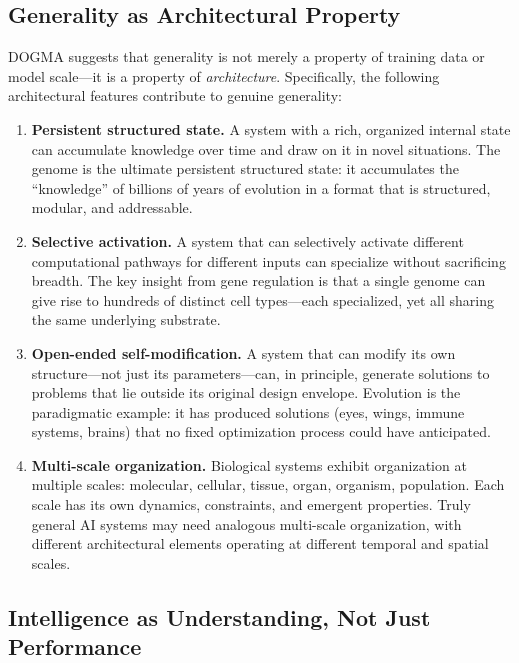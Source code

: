\subsection{Generality as Architectural Property}

DOGMA suggests that generality is not merely a property of training data or model scale---it is a property of \emph{architecture}. Specifically, the following architectural features contribute to genuine generality:

\begin{enumerate}[leftmargin=1.8em]
  \item \textbf{Persistent structured state.} A system with a rich, organized internal state can accumulate knowledge over time and draw on it in novel situations. The genome is the ultimate persistent structured state: it accumulates the ``knowledge'' of billions of years of evolution in a format that is structured, modular, and addressable.

  \item \textbf{Selective activation.} A system that can selectively activate different computational pathways for different inputs can specialize without sacrificing breadth. The key insight from gene regulation is that a single genome can give rise to hundreds of distinct cell types---each specialized, yet all sharing the same underlying substrate.

  \item \textbf{Open-ended self-modification.} A system that can modify its own structure---not just its parameters---can, in principle, generate solutions to problems that lie outside its original design envelope. Evolution is the paradigmatic example: it has produced solutions (eyes, wings, immune systems, brains) that no fixed optimization process could have anticipated.

  \item \textbf{Multi-scale organization.} Biological systems exhibit organization at multiple scales: molecular, cellular, tissue, organ, organism, population. Each scale has its own dynamics, constraints, and emergent properties. Truly general AI systems may need analogous multi-scale organization, with different architectural elements operating at different temporal and spatial scales.
\end{enumerate}

\subsection{Intelligence as Understanding, Not Just Performance}

